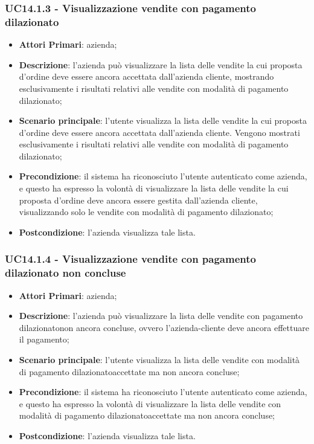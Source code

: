 \subsubsection{UC14.1.3 - Visualizzazione vendite con pagamento dilazionato}
\begin{itemize}
	\item \textbf{Attori Primari}: azienda;
	\item \textbf{Descrizione}: l'azienda può visualizzare la lista delle vendite la cui proposta d'ordine deve essere ancora accettata dall'azienda cliente, mostrando esclusivamente i risultati relativi alle vendite con modalità di pagamento dilazionato\glo;
	\item \textbf{Scenario principale}: l'utente visualizza la lista delle vendite la cui proposta d'ordine deve essere ancora accettata dall'azienda cliente. Vengono mostrati esclusivamente i risultati relativi alle vendite con modalità di pagamento dilazionato\glo;
	\item \textbf{Precondizione}: il sistema ha riconosciuto l'utente autenticato come azienda, e questo ha espresso la volontà di visualizzare la lista delle vendite la cui proposta d'ordine deve ancora essere gestita dall'azienda cliente, visualizzando solo le vendite con modalità di pagamento dilazionato\glo;
	\item \textbf{Postcondizione}: l'azienda visualizza tale lista.
\end{itemize}


\subsubsection{UC14.1.4 - Visualizzazione vendite con pagamento dilazionato non concluse}
\begin{itemize}
	\item \textbf{Attori Primari}: azienda;
	\item \textbf{Descrizione}: l'azienda può visualizzare la lista delle vendite con pagamento dilazionato\glosp non ancora concluse, ovvero l'azienda-cliente deve ancora effettuare il pagamento;
	\item \textbf{Scenario principale}: l'utente visualizza la lista delle vendite con modalità di pagamento dilazionato\glosp accettate ma non ancora concluse;
	\item \textbf{Precondizione}: il sistema ha riconosciuto l'utente autenticato come azienda, e questo ha espresso la volontà di visualizzare la lista delle vendite con modalità di pagamento dilazionato\glosp accettate ma non ancora concluse;
	\item \textbf{Postcondizione}: l'azienda visualizza tale lista.
\end{itemize}


